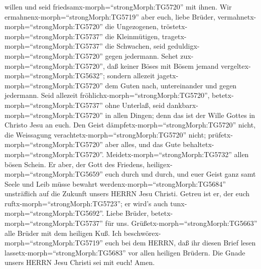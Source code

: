 willen und seid friedsamx-morph=``strongMorph:TG5720'' mit ihnen.
 Wir ermahnenx-morph=``strongMorph:TG5719'' aber euch,
liebe Brüder, vermahnetx-morph=``strongMorph:TG5720'' die Ungezogenen,
tröstetx-morph=``strongMorph:TG5737'' die Kleinmütigen,
tragetx-morph=``strongMorph:TG5737'' die Schwachen, seid
geduldigx-morph=``strongMorph:TG5720'' gegen jedermann. 
Sehet zux-morph=``strongMorph:TG5720'', daß keiner Böses mit Bösem
jemand vergeltex-morph=``strongMorph:TG5632''; sondern allezeit
jagetx-morph=``strongMorph:TG5720'' dem Guten nach, untereinander und
gegen jedermann.  Seid allezeit
fröhlichx-morph=``strongMorph:TG5720'', 
betetx-morph=``strongMorph:TG5737'' ohne Unterlaß,  seid
dankbarx-morph=``strongMorph:TG5720'' in allen Dingen; denn das ist der
Wille Gottes in Christo Jesu an euch.  Den Geist
dämpfetx-morph=``strongMorph:TG5720'' nicht,  die
Weissagung verachtetx-morph=``strongMorph:TG5720'' nicht; 
prüfetx-morph=``strongMorph:TG5720'' aber alles, und das Gute
behaltetx-morph=``strongMorph:TG5720''. 
Meidetx-morph=``strongMorph:TG5732'' allen bösen Schein. 
Er aber, der Gott des Friedens, heiligex-morph=``strongMorph:TG5659''
euch durch und durch, und euer Geist ganz samt Seele und Leib müsse
bewahrt werdenx-morph=``strongMorph:TG5684'' unsträflich auf die Zukunft
unsers HERRN Jesu Christi.  Getreu ist er, der euch
ruftx-morph=``strongMorph:TG5723''; er wird's auch
tunx-morph=``strongMorph:TG5692''.  Liebe Brüder,
betetx-morph=``strongMorph:TG5737'' für uns. 
Grüßetx-morph=``strongMorph:TG5663'' alle Brüder mit dem heiligen Kuß.
 Ich beschwörex-morph=``strongMorph:TG5719'' euch bei dem
HERRN, daß ihr diesen Brief lesen lassetx-morph=``strongMorph:TG5683''
vor allen heiligen Brüdern.  Die Gnade unsers HERRN Jesu
Christi sei mit euch! Amen.
